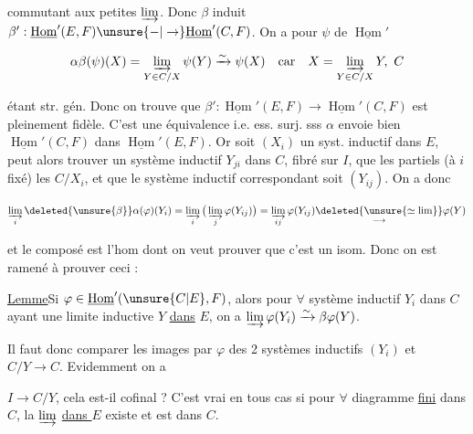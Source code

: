 
commutant aux petites $\varinjlim$. Donc $\beta$ induit $\beta':\underline{\operatorname{Hom}}'(E,F)\unsure{-|\to}\underline{\operatorname{Hom}}'(C,F)$. On a pour $\psi$ de $\underline{\operatorname{Hom}}'$

\[\alpha\beta(\psi)(X)=\varinjlim_{Y\in C/X}\psi(Y)\xrightarrow{\sim}\psi(X)\quad\text{car}\quad X=\varinjlim_{Y\in C/X}Y,\ C\]

étant str. gén. Donc on trouve que $\beta':\underline{\operatorname{Hom}}'(E,F)\to\underline{\operatorname{Hom}}'(C,F)$ est pleinement fidèle. C'est une équivalence i.e. ess. surj. sss $\alpha$  envoie bien $\underline{\operatorname{Hom}}'(C,F)$ dans $\underline{\operatorname{Hom}}'(E,F)$. Or soit $(X_i)$ un syst. inductif dans $E$,  peut alors trouver un système inductif $Y_{ji}$ dans $C$,  fibré sur $I$,  que les  partiels (à $i$ fixé)  les $C/X_i$,  et que le système inductif correspondant soit $(Y_{ij})$. On a donc

\[\varinjlim_i\deleted{\unsure{\beta}}\alpha(\varphi)(Y_i)=\varinjlim_i\big(\varinjlim_j\varphi(Y_{ij})\big)=\varinjlim_{ij}\varphi(Y_{ij})\underset{\longrightarrow}{\deleted{\unsure{\simeq\lim}}}\varphi(Y)\]

et le composé est l'hom dont on veut prouver que c'est un isom. Donc on est ramené à prouver ceci :

\uline{Lemme}\quad Si $\varphi\in\underline{\operatorname{Hom}}'(\unsure{C|E},F)$, alors pour $\forall$ système inductif $Y_i$ dans $C$ ayant une limite inductive $Y$ \uline{dans} $E$, on a $\varinjlim\varphi(Y_i)\xrightarrow{\sim}\beta\varphi(Y)$.

Il faut donc comparer  les images par $\varphi$ des 2 systèmes inductifs $(Y_i)$ et $C/Y\to C$. Evidemment on a


$I\to C/Y$, cela est-il cofinal ? C'est vrai en tous cas si pour $\forall$ diagramme \uline{fini} dans $C$, la $\varinjlim$ \uline{dans $E$} existe et est dans $C$.

